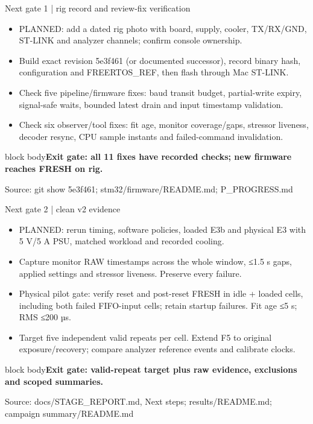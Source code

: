 \documentclass[aspectratio=169,12pt,t]{beamer}
\newcommand{\src}[1]{\par\vfill{\small\color{muted}Source: #1}}
\newcommand{\takeaway}[1]{\par\medskip\begin{beamercolorbox}[sep=2mm,wd=\linewidth]{block body}\color{navy}\textbf{#1}\end{beamercolorbox}}
\begin{document}
\begin{frame}{Next gate 1 | rig record and review-fix verification}
\begin{itemize}
\item PLANNED: add a dated rig photo with board, supply, cooler, TX/RX/GND, ST-LINK and analyzer channels; confirm console ownership.
\item Build exact revision 5e3f461 (or documented successor), record binary hash, configuration and FREERTOS\_REF, then flash through Mac ST-LINK.
\item Check five pipeline/firmware fixes: baud transit budget, partial-write expiry, signal-safe waits, bounded latest drain and input timestamp validation.
\item Check six observer/tool fixes: fit age, monitor coverage/gaps, stressor liveness, decoder resync, CPU sample instants and failed-command invalidation.
\end{itemize}
\takeaway{Exit gate: all 11 fixes have recorded checks; new firmware reaches FRESH on rig.}\src{git show 5e3f461; stm32/firmware/README.md; P\_PROGRESS.md}
\end{frame}
\begin{frame}{Next gate 2 | clean v2 evidence}
\begin{itemize}
\item PLANNED: rerun timing, software policies, loaded E3b and physical E3 with 5 V/5 A PSU, matched workload and recorded cooling.
\item Capture monitor RAW timestamps across the whole window, ≤1.5 s gaps, applied settings and stressor liveness. Preserve every failure.
\item Physical pilot gate: verify reset and post-reset FRESH in idle + loaded cells, including both failed FIFO-input cells; retain startup failures. Fit age ≤5 s; RMS ≤200 µs.
\item Target five independent valid repeats per cell. Extend F5 to original exposure/recovery; compare analyzer reference events and calibrate clocks.
\end{itemize}
\takeaway{Exit gate: valid-repeat target plus raw evidence, exclusions and scoped summaries.}\src{docs/STAGE\_REPORT.md, Next steps; results/README.md; campaign summary/README.md}
\end{frame}
\end{document}
